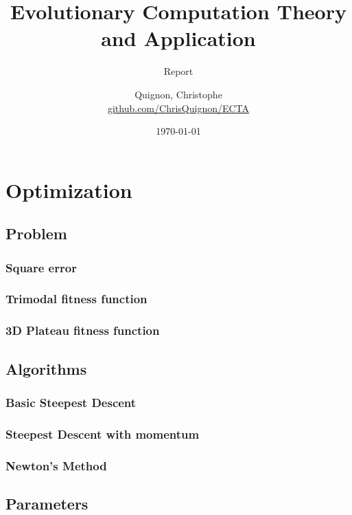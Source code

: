 \documentclass{scrartcl}
\begin{document}
\title{Evolutionary Computation Theory and Application}
\subtitle{Report}
\author{
  Quignon, Christophe \\
  \href{https://github.com/ChrisQuignon/ECTA}{github.com/ChrisQuignon/ECTA}
} 
\date{\today}


\maketitle


\setcounter{tocdepth}{2}
\setcounter{secnumdepth}{2}
\tableofcontents{}


\section{Optimization}

\subsection{Problem}
\subsubsection{Square error}
\subsubsection{Trimodal fitness function}
\subsubsection{3D Plateau fitness function}

\subsection{Algorithms}
\subsubsection{Basic Steepest Descent}
\subsubsection{Steepest Descent with momentum}
\subsubsection{Newton’s Method}

\subsection{Parameters}
\end{document}
